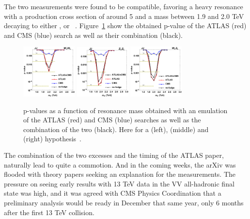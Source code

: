 The two measurements were found to be compatible, favoring a heavy resonance with a production cross section of around 5 \fbinv and a mass between 1.9 and 2.0 TeV decaying to either \PW\PW, \PW\PZ or \PZ\PZ~\cite{Dias:2015mhm}. Figure~\ref{fig:searchI:8tevcombo} show the obtained p-value of the ATLAS (red) and CMS (blue) search as well as their combination (black).  

\begin{figure}[ht] 
    \centering
    \includegraphics[width=0.25\textwidth]{figures/analysis/search1/misc/CMS_ATLAS_BulkWW_JJ_dijetfit_p.png}
    \includegraphics[width=0.25\textwidth]{figures/analysis/search1/misc/CMS_ATLAS_BulkZZ_JJ_dijetfit_p.png}
    \includegraphics[width=0.25\textwidth]{figures/analysis/search1/misc/CMS_ATLAS_WZ_JJ_dijetfit_p.png}
    \caption{p-values as a function of resonance mass obtained with an emulation of the ATLAS (red) and CMS (blue) searches as well as the combination of the two (black). Here for a \PW\PW (left), \PW\PZ (middle) and \PZ\PZ (right) hypothesis~\cite{Dias:2015mhm}.}
    \label{fig:searchI:8tevcombo}
\end{figure}

The combination of the two excesses and the timing of the ATLAS paper, naturally lead to quite a commotion. And in the coming weeks, the arXiv was flooded with theory papers seeking an explanation for the measurements.
The pressure on seeing early results with 13 TeV data in the VV all-hadronic final state was high, and it was agreed with CMS Physics Coordination that a preliminary analysis would be ready in December that same year, only 6 months after the first 13 TeV collision.

